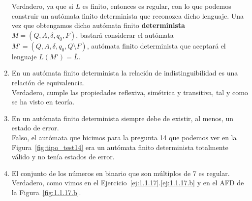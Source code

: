 \begin{enumerate}
        Verdadero, ya que si $L$ es finito, entonces es regular, con lo que podemos construir un autómata finito determinista que reconozca dicho lenguaje. Una vez que obtengamos dicho autómata finito \textbf{determinista} $M=(Q,A,\delta,q_0,F)$, bastará considerar el autómata $M'=(Q,A,\delta,q_0,Q\setminus F)$, autómata finito determinista que aceptará el lenguaje $L(M') = \overline{L}$.
    \item En un autómata finito determinista la relación de indistinguibilidad es una relación de equivalencia.\\

        Verdadero, cumple las propiedades reflexiva, simétrica y transitiva, tal y como se ha visto en teoría.
    \item En un autómata finito determinista siempre debe de existir, al menos, un estado de error.\\

        Falso, el autómata que hicimos para la pregunta 14 que podemos ver en la Figura~\ref{fig:tipo_test14} era un autómata finito determinista totalmente válido y no tenía estados de error.

    \item El conjunto de los números en binario que son múltiplos de 7 es regular.\\

        Verdadero, como vimos en el Ejercicio~\ref{ej:1.1.17}.\ref{ej:1.1.17.b} y en el AFD de la Figura~\ref{fig:1.1.17.b}.
        

\end{enumerate}
